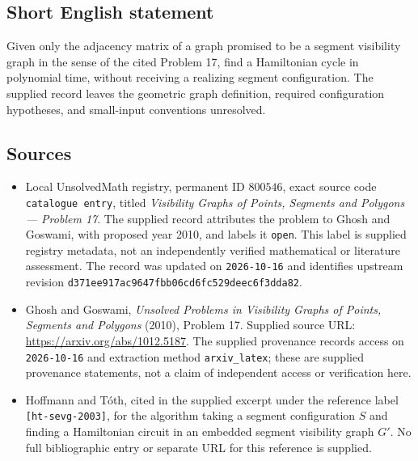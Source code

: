 \documentclass[11pt]{article}
\begin{document}
\subsection{Short English statement}
Given only the adjacency matrix of a graph promised to be a segment visibility graph in the sense of the cited Problem 17, find a Hamiltonian cycle in polynomial time, without receiving a realizing segment configuration. The supplied record leaves the geometric graph definition, required configuration hypotheses, and small-input conventions unresolved.
\subsection{Sources}
\begin{itemize}
\item Local UnsolvedMath registry, permanent ID \(800546\), exact source code \texttt{catalogue entry}, titled \emph{Visibility Graphs of Points, Segments and Polygons --- Problem 17}. The supplied record attributes the problem to Ghosh and Goswami, with proposed year 2010, and labels it \texttt{open}. This label is supplied registry metadata, not an independently verified mathematical or literature assessment. The record was updated on \texttt{2026-10-16} and identifies upstream revision \texttt{d371ee917ac9647fbb06cd6fc529deec6f3dda82}.
\item Ghosh and Goswami, \emph{Unsolved Problems in Visibility Graphs of Points, Segments and Polygons} (2010), Problem 17. Supplied source URL: \url{https://arxiv.org/abs/1012.5187}. The supplied provenance records access on \texttt{2026-10-16} and extraction method \texttt{arxiv\_latex}; these are supplied provenance statements, not a claim of independent access or verification here.
\item Hoffmann and T\'{o}th, cited in the supplied excerpt under the reference label \texttt{[ht-sevg-2003]}, for the algorithm taking a segment configuration \(S\) and finding a Hamiltonian circuit in an embedded segment visibility graph \(G'\). No full bibliographic entry or separate URL for this reference is supplied.
\end{itemize}
\end{document}
